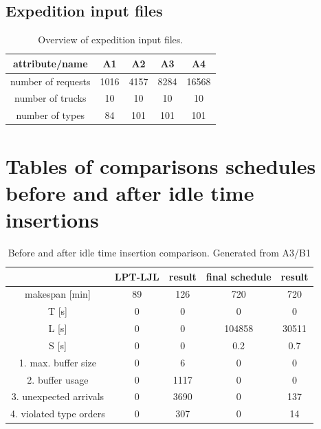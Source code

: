 \documentclass{ctuthesis}
\begin{document}
\section{Expedition input files}
\begin{table}[H]
\begin{tabular}{ |c| c c c c|} 
\hline
attribute/name & A1 & A2 & A3 & A4\\ 
\hline
number of requests & 1016 & 4157 & 8284 & 16568 \\
\hline
number of trucks & 10 & 10 & 10 & 10 \\ 
\hline
number of types & 84 & 101 & 101 & 101 \\ 
\hline
\end{tabular}
\caption{Overview of expedition input files.} \label{tab:in2}
\end{table}

\chapter{Tables of comparisons schedules before and after idle time insertions}

\begin{table}[H]
\begin{tabular}{ |c|| c | c | c | c |} 
\hline
 & LPT-LJL & result & final schedule & result \\ 
\hline
makespan [min] & 89 & 126 & 720 & 720 \\
\hline
T [s]& 0 & 0 & 0 & 0 \\
\hline
L [s]& 0 & 0 & 104858 & 30511 \\
\hline
S [s]& 0 & 0 & 0.2 & 0.7 \\
\hline
1. max. buffer size & 0 & 6 & 0 & 0\\ 
\hline
2. buffer usage  & 0 & 1117 & 0 & 0\\ 
\hline
3. unexpected arrivals & 0 & 3690 & 0 & 137\\ 
\hline
4. violated type orders & 0 & 307 & 0 & 14\\ 
\hline
\end{tabular}
\caption{Before and after idle time insertion comparison. Generated from A3/B1}
\end{table}
\end{document}
